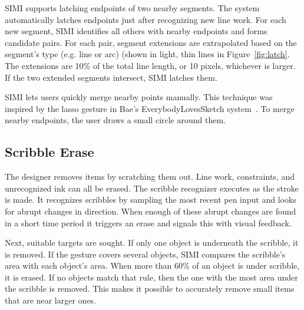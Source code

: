 \documentclass{chi-ext}
\begin{document}

SIMI supports latching endpoints of two nearby segments. The system
automatically latches endpoints just after recognizing new line
work. For each new segment, SIMI identifies all others with nearby
endpoints and forms candidate pairs. For each pair, segment extensions
are extrapolated based on the segment's type (e.g. line or arc) (shown
in light, thin lines in Figure~\ref{fig:latch}. The extensions are
10\% of the total line length, or 10 pixels, whichever is larger. If
the two extended segments intersect, SIMI latches them.

SIMI lets users quickly merge nearby points manually. This technique
was inspired by the lasso gesture in Bae's EverybodyLovesSketch
system~\cite{bae-everybody}. To merge nearby endpoints, the user draws
a small circle around them.

\subsection{Scribble Erase}

The designer removes items by scratching them out. Line work,
constraints, and unrecognized ink can all be erased. The scribble
recognizer executes as the stroke is made. It recognizes scribbles by
sampling the most recent pen input and looks for abrupt changes in
direction. When enough of these abrupt changes are found in a short
time period it triggers an erase and signals this with visual
feedback.

Next, suitable targets are sought. If only one object is underneath
the scribble, it is removed. If the gesture covers several objects,
SIMI compares the scribble's area with each object's area. When more
than 60\% of an object is under scribble, it is erased. If no objects
match that rule, then the one with the most area under the scribble is
removed. This makes it possible to accurately remove small items that
are near larger ones.
\end{document}
